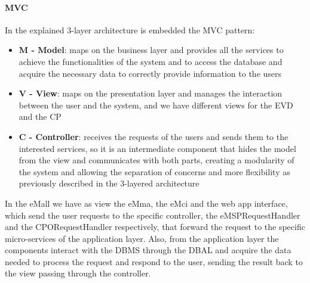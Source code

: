\paragraph{MVC}
In the explained 3-layer architecture is embedded the MVC pattern:
\begin{itemize}
    \item \textbf{M - Model}: maps on the business layer and provides all the services to achieve the functionalities of the system and to access the database and acquire the necessary data to correctly provide information to the users 
    \item \textbf{V - View}: maps on the presentation layer and manages the interaction between the user and the system, and we have different views for the EVD and the CP
    \item \textbf{C - Controller}: receives the requests of the users and sends them to the interested services, so it is an intermediate component that hides the model from the view and communicates with both parts, creating a modularity of the system and allowing the separation of concerns and more flexibility as previously described in the 3-layered architecture
\end{itemize}
In the eMall we have as view the eMma, the eMci and the web app interface, which send the user requests to the specific controller, the eMSPRequestHandler and the CPORequestHandler respectively, that forward the request to the specific micro-services of the application layer. Also, from the application layer the components interact with the DBMS through the DBAL and acquire the data needed to process the request and respond to the user, sending the result back to the view passing through the controller.


